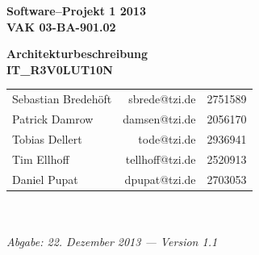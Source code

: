 \documentclass[fontsize=12pt,paper=a4,twoside]{scrartcl}
\begin{document}
  \thispagestyle{fancy}
  \fancyhead[LO,RE]{ }
  \fancyfoot[C]{}

  \vspace{3cm}

  \begin{minipage}[H]{\textwidth}
  \begin{center}
  \bf
  \Large
  Software--Projekt 1 2013\\
  \smallskip
  \small
  VAK 03-BA-901.02\\
  \vspace{3cm}
  \end{center}
  \end{minipage}
  \begin{minipage}[H]{\textwidth}
  \begin{center}
  \vspace{1cm}
  \bf
  \Large Architekturbeschreibung\\
  \vspace{3ex} \small IT\_R3V0LUT10N\\
  \vfill
  \end{center}
  \end{minipage}
  \vfill
  \begin{minipage}[H]{\textwidth}
  \begin{center}
  \sf
  \begin{tabular}{lrr}
 			Sebastian Bredehöft & sbrede@tzi.de & 2751589\\
 			Patrick Damrow & damsen@tzi.de & 2056170\\
 			Tobias Dellert & tode@tzi.de & 2936941\\
 			Tim Ellhoff & tellhoff@tzi.de & 2520913\\
 			Daniel Pupat & dpupat@tzi.de & 2703053\\
  \end{tabular}
  \\ ~
  \vspace{2cm}
  \\
  \it Abgabe: 22. Dezember 2013 --- Version 1.1\\ ~
  \end{center}
  \end{minipage}

\end{document}
